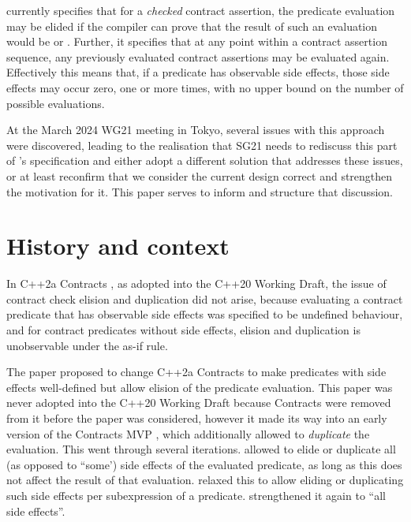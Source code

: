 \cite{P2900R6} currently specifies that for a \emph{checked} contract assertion, the predicate evaluation may be elided if the compiler can prove that the result of such an evaluation would be  or . Further, it specifies that at any point within a contract assertion sequence, any previously evaluated contract assertions may be evaluated again. Effectively this means that, if a predicate has observable side effects, those side effects may occur zero, one or more times, with no upper bound on the number of possible evaluations.

At the March 2024 WG21 meeting in Tokyo, several issues with this approach were discovered, leading to the realisation that SG21 needs to rediscuss this part of \cite{P2900R6}'s specification and either adopt a different solution that addresses these issues, or at least reconfirm that we consider the current design correct and strengthen the motivation for it.  This paper serves to inform and structure that discussion.


\section{History and context}

In C++2a Contracts \cite{P0542R5}, as adopted into the C++20 Working Draft, the issue of contract check elision and duplication did not arise, because evaluating a contract predicate that has observable side effects was specified to be undefined behaviour, and for contract predicates without side effects, elision and duplication is unobservable under the as-if rule.

The paper \cite{P1670R0} proposed to change C++2a Contracts to make predicates with side effects well-defined but allow elision of the predicate evaluation. This paper was never adopted into the C++20 Working Draft because Contracts were removed from it before the paper was considered, however it made its way into an early version of the Contracts MVP \cite{P2388R4}, which additionally allowed to \emph{duplicate} the evaluation. This went through several iterations. \cite{P2388R0} allowed to elide or duplicate all (as opposed to ``some') side effects of the evaluated predicate, as long as this does not affect the result of that evaluation. \cite{P2388R3} relaxed this to allow eliding or duplicating such side effects per subexpression of a predicate. \cite{P2521R5} strengthened it again to ``all side effects''.

